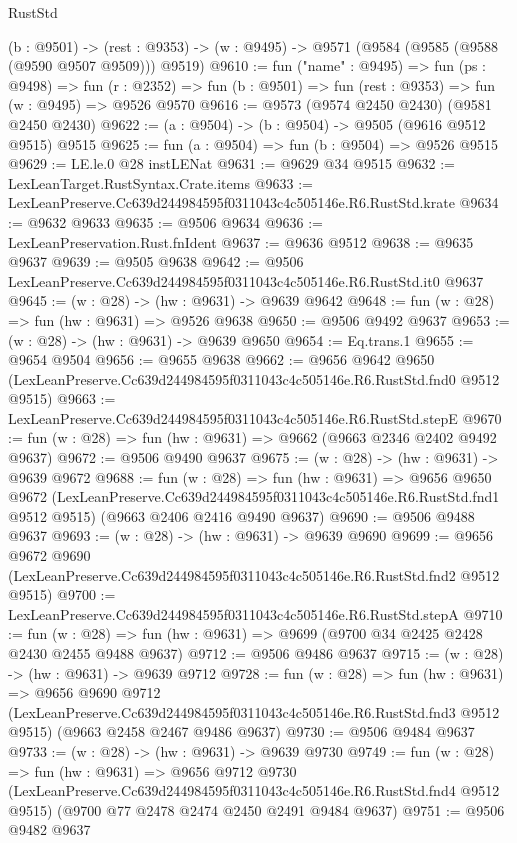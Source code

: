 \begin{lexlean}{RustStd}
\begin{coremodule}
  (b : @9501) ->
  (rest : @9353) -> (w : @9495) -> @9571 (@9584 (@9585 (@9588 (@9590 @9507 @9509))) @9519)
@9610 := fun ("name" : @9495) =>
  fun (ps : @9498) =>
  fun (r : @2352) => fun (b : @9501) => fun (rest : @9353) => fun (w : @9495) => @9526 @9570
@9616 := @9573 (@9574 @2450 @2430) (@9581 @2450 @2430)
@9622 := (a : @9504) -> (b : @9504) -> @9505 (@9616 @9512 @9515) @9515
@9625 := fun (a : @9504) => fun (b : @9504) => @9526 @9515
@9629 := LE.le.{0} @28 instLENat
@9631 := @9629 @34 @9515
@9632 := LexLeanTarget.RustSyntax.Crate.items
@9633 := LexLeanPreserve.Cc639d244984595f0311043c4c505146e.R6.RustStd.krate
@9634 := @9632 @9633
@9635 := @9506 @9634
@9636 := LexLeanPreservation.Rust.fnIdent
@9637 := @9636 @9512
@9638 := @9635 @9637
@9639 := @9505 @9638
@9642 := @9506 LexLeanPreserve.Cc639d244984595f0311043c4c505146e.R6.RustStd.it0 @9637
@9645 := (w : @28) -> (hw : @9631) -> @9639 @9642
@9648 := fun (w : @28) => fun (hw : @9631) => @9526 @9638
@9650 := @9506 @9492 @9637
@9653 := (w : @28) -> (hw : @9631) -> @9639 @9650
@9654 := Eq.trans.{1}
@9655 := @9654 @9504
@9656 := @9655 @9638
@9662 := @9656
    @9642
    @9650
    (LexLeanPreserve.Cc639d244984595f0311043c4c505146e.R6.RustStd.fnd0 @9512 @9515)
@9663 := LexLeanPreserve.Cc639d244984595f0311043c4c505146e.R6.RustStd.stepE
@9670 := fun (w : @28) => fun (hw : @9631) => @9662 (@9663 @2346 @2402 @9492 @9637)
@9672 := @9506 @9490 @9637
@9675 := (w : @28) -> (hw : @9631) -> @9639 @9672
@9688 := fun (w : @28) =>
  fun (hw : @9631) =>
  @9656
    @9650
    @9672
    (LexLeanPreserve.Cc639d244984595f0311043c4c505146e.R6.RustStd.fnd1 @9512 @9515)
    (@9663 @2406 @2416 @9490 @9637)
@9690 := @9506 @9488 @9637
@9693 := (w : @28) -> (hw : @9631) -> @9639 @9690
@9699 := @9656
    @9672
    @9690
    (LexLeanPreserve.Cc639d244984595f0311043c4c505146e.R6.RustStd.fnd2 @9512 @9515)
@9700 := LexLeanPreserve.Cc639d244984595f0311043c4c505146e.R6.RustStd.stepA
@9710 := fun (w : @28) => fun (hw : @9631) => @9699 (@9700 @34 @2425 @2428 @2430 @2455 @9488 @9637)
@9712 := @9506 @9486 @9637
@9715 := (w : @28) -> (hw : @9631) -> @9639 @9712
@9728 := fun (w : @28) =>
  fun (hw : @9631) =>
  @9656
    @9690
    @9712
    (LexLeanPreserve.Cc639d244984595f0311043c4c505146e.R6.RustStd.fnd3 @9512 @9515)
    (@9663 @2458 @2467 @9486 @9637)
@9730 := @9506 @9484 @9637
@9733 := (w : @28) -> (hw : @9631) -> @9639 @9730
@9749 := fun (w : @28) =>
  fun (hw : @9631) =>
  @9656
    @9712
    @9730
    (LexLeanPreserve.Cc639d244984595f0311043c4c505146e.R6.RustStd.fnd4 @9512 @9515)
    (@9700 @77 @2478 @2474 @2450 @2491 @9484 @9637)
@9751 := @9506 @9482 @9637

\end{coremodule}
\end{lexlean}
